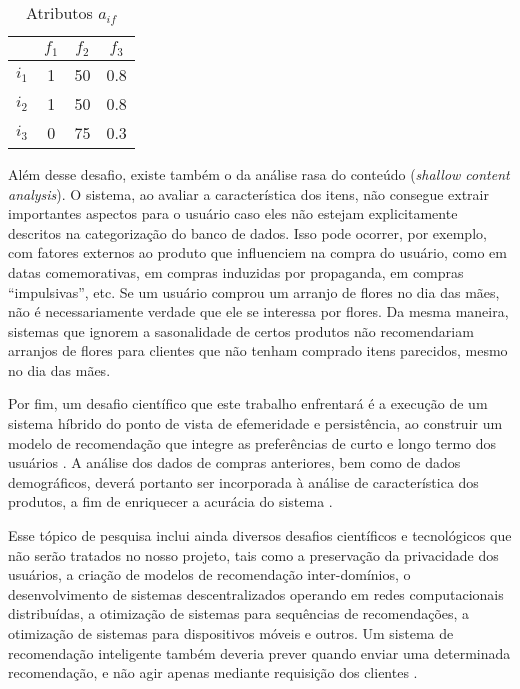 \begin{table}[h]
\begin{center}
    \caption{Atributos $a_{if}$}
    \label{tab:aif_overspec}
    \begin{tabular}{ | c | c | c | c | } 
    \hline
     & $f_1$ & $f_2$ & $f_3$ \\ \hline
     $i_1$ & 1 & 50 & 0.8 \\ \hline
     $i_2$ & 1 & 50 & 0.8 \\ \hline
     $i_3$ & 0 & 75 & 0.3 \\ \hline
    \end{tabular}
\end{center}
\end{table}

Além desse desafio, existe também o da análise rasa do conteúdo (\textit{shallow content analysis}). O sistema, ao avaliar a característica dos itens, não consegue extrair importantes aspectos para o usuário caso eles não estejam explicitamente descritos na categorização do banco de dados. Isso pode ocorrer, por exemplo, com fatores externos ao produto que influenciem na compra do usuário, como em datas comemorativas, em compras induzidas por propaganda, em compras ``impulsivas'', etc. Se um usuário comprou um arranjo de flores no dia das mães, não é necessariamente verdade que ele se interessa por flores. Da mesma maneira, sistemas que ignorem a sasonalidade de certos produtos não recomendariam arranjos de flores para clientes que não tenham comprado itens parecidos, mesmo no dia das mães.

Por fim, um desafio científico que este trabalho enfrentará é a execução de um sistema híbrido do ponto de vista de efemeridade e persistência, ao construir um modelo de recomendação que integre as preferências de curto e longo termo dos usuários \cite{schafer1999recommender}. A análise dos dados de compras anteriores, bem como de dados demográficos, deverá portanto ser incorporada à análise de característica dos produtos, a fim de enriquecer a acurácia do sistema \cite{wei2007survey}.

Esse tópico de pesquisa inclui ainda diversos desafios científicos e tecnológicos que não serão tratados no nosso projeto, tais como a preservação da privacidade dos usuários, a criação de modelos de recomendação inter-domínios, o desenvolvimento de sistemas descentralizados operando em redes computacionais distribuídas, a otimização de sistemas para sequências de recomendações, a otimização de sistemas para dispositivos móveis e outros. Um sistema de recomendação inteligente também deveria prever quando enviar uma determinada recomendação, e não agir apenas mediante requisição dos clientes \cite{lops2011content}.

